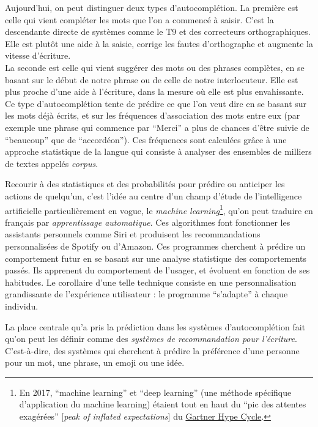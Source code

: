 \documentclass[]{article}
\begin{document}
Aujourd'hui, on peut distinguer deux types d'autocomplétion. La première
est celle qui vient compléter les mots que l'on a commencé à saisir.
C'est la descendante directe de systèmes comme le T9 et des correcteurs
orthographiques. Elle est plutôt une aide à la saisie, corrige les
fautes d'orthographe et augmente la vitesse d'écriture.\\
La seconde est celle qui vient suggérer des mots ou des phrases
complètes, en se basant sur le début de notre phrase ou de celle de
notre interlocuteur. Elle est plus proche d'une aide à l'écriture, dans
la mesure où elle est plus envahissante. Ce type d'autocomplétion tente
de prédire ce que l'on veut dire en se basant sur les mots déjà écrits,
et sur les fréquences d'association des mots entre eux (par exemple une
phrase qui commence par ``Merci'' a plus de chances d'être suivie de
``beaucoup'' que de ``accordéon''). Ces fréquences sont calculées grâce
à une approche statistique de la langue qui consiste à analyser des
ensembles de milliers de textes appelés \emph{corpus}.

Recourir à des statistiques et des probabilités pour prédire ou
anticiper les actions de quelqu'un, c'est l'idée au centre d'un champ
d'étude de l'intelligence artificielle particulièrement en vogue, le
\emph{machine learning}\footnote{En 2017, ``machine learning'' et ``deep
  learning'' (une méthode spécifique d'application du machine learning)
  étaient tout en haut du ``pic des attentes exagérées'' {[}\emph{peak
  of inflated expectations}{]} du
  \href{https://blogs.gartner.com/smarterwithgartner/files/2017/08/Emerging-Technology-Hype-Cycle-for-2017_Infographic_R6A.jpg}{Gartner
  Hype Cycle}.}, qu'on peut traduire en français par \emph{apprentissage
automatique}. Ces algorithmes font fonctionner les assistants personnels
comme Siri et produisent les recommandations personnalisées de Spotify
ou d'Amazon. Ces programmes cherchent à prédire un comportement futur en
se basant sur une analyse statistique des comportements passés. Ils
apprenent du comportement de l'usager, et évoluent en fonction de ses
habitudes. Le corollaire d'une telle technique consiste en une
personnalisation grandissante de l'expérience utilisateur : le programme
``s'adapte'' à chaque individu.

La place centrale qu'a pris la prédiction dans les systèmes
d'autocomplétion fait qu'on peut les définir comme des \emph{systèmes de
recommandation pour l'écriture}. C'est-à-dire, des systèmes qui
cherchent à prédire la préférence d'une personne pour un mot, une
phrase, un emoji ou une idée.
\end{document}
